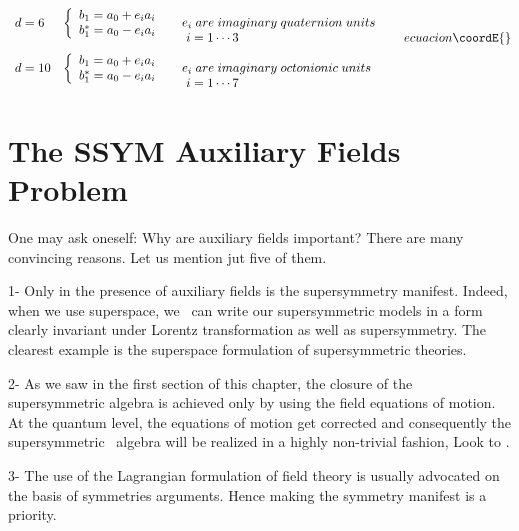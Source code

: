 \documentclass[a4paper,12pt]{book}
\begin{document}
\begin{itemize}
\begin{equation}
{\begin{array}{llll}
&  \\ 
d=6 & \left\{ 
\begin{array}{l}
b_{1}=a_{0}+e_{i}a_{i} \\ 
b_{1}^{*}=a_{0}-e_{i}a_{i}
\end{array}
\right. & 
\begin{array}{l}
\\ 
e_{i}\;are\;imaginary\;quaternion\;units \\ 
{\ i=1\cdots 3}
\end{array}
&  \\ 
d=10 & \left\{ 
\begin{array}{l}
b_{1}=a_{0}+e_{i}a_{i} \\ 
b_{1}^{*}=a_{0}-e_{i}a_{i}
\end{array}
\right. & 
\begin{array}{l}
\\ 
e_{i}\;are\;imaginary\;octonionic\;units \\ 
{\ i=1\cdots 7}
\end{array}
& 
\end{array}
\;
}{ecuacion}\coordE{}\end{equation}
\end{itemize}

\section{The SSYM Auxiliary Fields Problem}

One may ask oneself: Why are auxiliary fields important? There are many
convincing reasons. Let us mention jut five of them.

1- Only in the presence of auxiliary fields is the supersymmetry manifest.
Indeed, when we use superspace, we \ can write our supersymmetric models in
a form clearly invariant under Lorentz transformation as well as
supersymmetry. The clearest example is the superspace formulation of \coordHE{}
supersymmetric theories.

2- As we saw in the first section of this chapter, the closure of the
supersymmetric algebra is achieved only by using the field equations of
motion. At the quantum level, the equations of motion get corrected and
consequently the supersymmetric \ algebra will be realized in a highly
non-trivial fashion, Look to \cite{superspace}.

3- The use of the Lagrangian formulation of field theory is usually
advocated on the basis of symmetries arguments. Hence making the symmetry
manifest is a priority.
\end{document}
